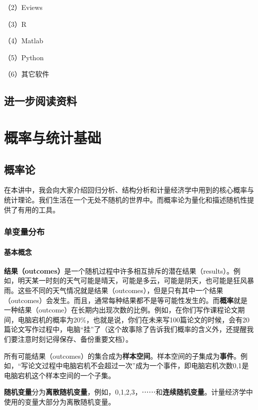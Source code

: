 \documentclass[cn,12pt,math=newtx,citestyle=gb7714-2015,bibstyle=gb7714-2015]{elegantbook}
\begin{document}
	（2）Eviews
	
	（3）R
	
	（4）Matlab
	
	（5）Python
	
	（6）其它软件
	\section{进一步阅读资料}
	
	
	
	\chapter{概率与统计基础}
	\section{概率论}
	在本讲中，我会向大家介绍回归分析、结构分析和计量经济学中用到的核心概率与统计理论。我们生活在一个无处不随机的世界中。而概率论为量化和描述随机性提供了有用的工具。
	\subsection{单变量分布}
	\subsubsection{基本概念}
	\textbf{结果（outcomes）}是一个随机过程中许多相互排斥的潜在结果（results）。例如，明天某一时刻的天气可能是晴天，可能是多云，可能是阴天，也可能是狂风暴雨。这些不同的天气情况就是结果（outcomes），但是只有其中一个结果（outcomes）会发生。而且，通常每种结果都不是等可能性发生的。而\textbf{概率}就是一种结果（outcome）在长期内出现次数的比例。例如，在你们写作课程论文期间，电脑宕机的概率为20\%，也就是说，你们在未来写100篇论文的时候，会有20篇论文写作过程中，电脑“挂”了（这个故事除了告诉我们概率的含义外，还提醒我们要注意时刻记得保存、备份重要文档）。
	
	所有可能结果（outcomes）的集合成为\textbf{样本空间}。样本空间的子集成为\textbf{事件}。例如，“写论文过程中电脑宕机不会超过一次”成为一个事件，即电脑宕机次数{0,1}是电脑宕机这个样本空间的一个子集。
	
	\textbf{随机变量}分为\textbf{离散随机变量}，例如，0,1,2,3，⋯⋯和\textbf{连续随机变量}。计量经济学中使用的变量大部分为离散随机变量。
	
\end{document}
